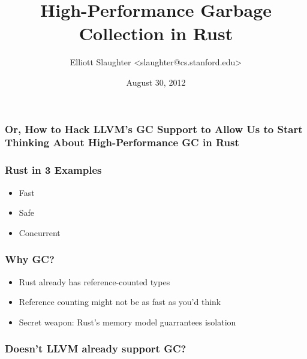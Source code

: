 \documentclass[ignorenonframetext,]{beamer}
\title{High-Performance Garbage Collection in Rust}
\author{Elliott Slaughter \textless{}slaughter@cs.stanford.edu\textgreater{}}
\date{August 30, 2012}
\begin{document}
\frame{\titlepage}
\maketitle

\begin{frame}\frametitle{Or, How to Hack LLVM's GC Support to Allow Us
to Start Thinking About High-Performance GC in Rust}
\end{frame}

\begin{frame}[fragile]\frametitle{Rust in 3 Examples}

\begin{itemize}
  \item<alert@2> Fast
  \item<alert@3> Safe
  \item<alert@4> Concurrent
\end{itemize}


\end{frame}

\begin{frame}\frametitle{Why GC?}

\begin{itemize}
\item
  Rust already has reference-counted types
\item
  Reference counting might not be as fast as you'd think
\item
  Secret weapon: Rust's memory model guarrantees isolation
\end{itemize}

\end{frame}

\begin{frame}\frametitle{Doesn't LLVM already support GC?}

\end{frame}
\end{document}
